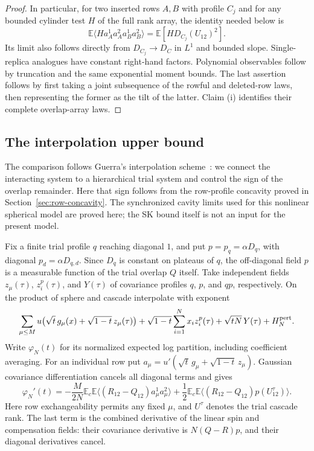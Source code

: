 \documentclass[11pt,a4paper]{article}
\numberwithin{equation}{section}
\theoremstyle{definition}
\theoremstyle{remark}
\newcommand{\E}{\mathbb E}
\begin{document}
\begin{proof}
In particular, for two inserted rows $A,B$ with profile $C_j$ and for any
bounded cylinder test $H$ of the full rank array, the identity needed below is
\[
 \E\langle H a_A^1a_A^2a_B^1a_B^2\rangle
       =\E[H D_{C_j}(U_{12})^2].
\]
Its limit also follows directly from $D_{C_j}\to D_C$ in $L^1$ and bounded
slope. Single-replica analogues have constant right-hand factors.
Polynomial observables follow by truncation and the same exponential moment
bounds. The last assertion follows by first taking a joint subsequence of
the rowful and deleted-row laws, then representing the former as the tilt of
the latter. Claim (i) identifies their complete overlap-array laws.
\end{proof}

\subsection{The interpolation upper bound}

The comparison follows Guerra's interpolation scheme~\cite[\S4]{Guerra2003}:
we connect the interacting system to a hierarchical trial system and
control the sign of the overlap remainder. Here that sign follows from
the row-profile concavity proved in Section~\ref{sec:row-concavity}.
The synchronized cavity limits used for this nonlinear spherical model
are proved here; the SK bound itself is not an input for the present model.

Fix a finite trial profile $q$ reaching diagonal $1$, and put
$p=p_q=\alpha D_q$, with diagonal $p_d=\alpha D_{q,d}$. Since $D_q$ is constant on plateaus of
$q$, the off-diagonal field $p$ is a measurable function of the trial overlap
$Q$ itself.
Take independent fields $z_\mu(\tau)$, $z_i^p(\tau)$, and $Y(\tau)$ of
covariance profiles $q$, $p$, and $qp$, respectively. On the product of sphere
and cascade interpolate with exponent
\begin{equation}\label{eq:press-interpolating-exponent}
 \sum_{\mu\le M}u\big(\sqrt t\,g_\mu(x)+\sqrt{1-t}\,z_\mu(\tau)\big)
 +\sqrt{1-t}\sum_{i=1}^N x_i z_i^p(\tau)
 +\sqrt{tN}\,Y(\tau)+H_N^{\rm pert}.
\end{equation}
Write $\varphi_N(t)$ for its normalized expected log partition, including
coefficient averaging. For an individual row put
$a_\mu=u'(\sqrt t\,g_\mu+\sqrt{1-t}\,z_\mu)$.
Gaussian covariance differentiation cancels all diagonal terms and gives
\begin{equation}\label{eq:press-interpolation-derivative}
 \varphi_N'(t)
 =-\frac{M}{2N}\E_c\E\langle(R_{12}-Q_{12})a_\mu^1a_\mu^2\rangle
   +\frac12\E_c\E\langle(R_{12}-Q_{12})p(U_{12}^{\tau})\rangle.
\end{equation}
Here row exchangeability permits any fixed $\mu$, and $U^\tau$ denotes the
trial cascade rank. The last term is the combined derivative of the linear
spin and compensation fields: their covariance derivative is
$N(Q-R)p$, and their diagonal derivatives cancel.
\end{document}
